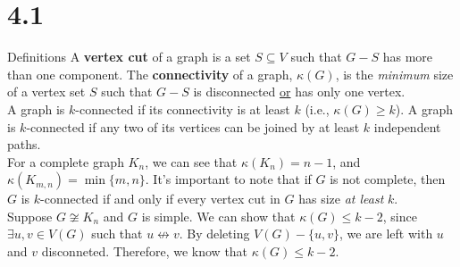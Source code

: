\documentclass[10pt]{extarticle}
\begin{document}
  \section*{4.1}%
  \begin{problem}{Definitions}
    A \textbf{vertex cut} of a graph is a set $S\subseteq V$ such that $G-S$ has more than one component. The \textbf{connectivity} of a graph, $\kappa(G)$, is the \textit{minimum} size of a vertex set $S$ such that $G-S$ is disconnected \underline{or} has only one vertex.\\

    A graph is $k$-connected if its connectivity is at least $k$ (i.e., $\kappa(G) \geq k$). A graph is $k$-connected if any two of its vertices can be joined by at least $k$ independent paths.\\

    For a complete graph $K_n$, we can see that $\kappa(K_n) = n-1$, and $\kappa(K_{m,n}) = \min\{m,n\}$. It's important to note that if $G$ is not complete, then $G$ is $k$-connected if and only if every vertex cut in $G$ has size \textit{at least} $k$.\\

    Suppose $G \not\cong K_n$ and $G$ is simple. We can show that $\kappa(G) \leq k-2$, since $\exists u,v\in V(G)$ such that $u\not\leftrightarrow v$. By deleting $V(G) - \{u,v\}$, we are left with $u$ and $v$ disconneted. Therefore, we know that $\kappa(G) \leq k-2$.
  \end{problem}
\end{document}
